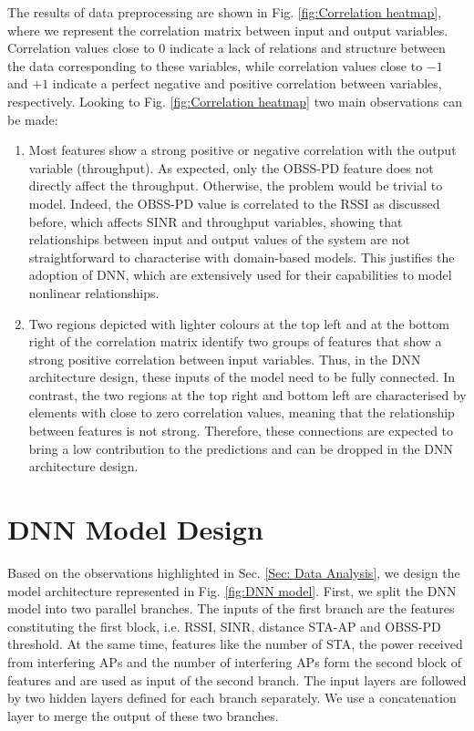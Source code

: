 \documentclass[10pt,conference ]{IEEEtran}
\begin{document}
The results of data preprocessing are shown in Fig. \ref{fig:Correlation heatmap}, where we represent the correlation matrix between input and output variables. 
Correlation values close to $0$ indicate a lack of relations and structure between the data corresponding to these variables, while correlation values close to $-1$ and $+1$ indicate a perfect negative and positive correlation between variables, respectively. 
Looking to Fig. \ref{fig:Correlation heatmap} two main observations can be made: 
\begin{enumerate}
\item Most features show a strong positive or negative correlation with the output variable (throughput). 
As expected, only the \ac{OBSS}-\ac{PD} feature does not directly affect the throughput. 
Otherwise, the problem would be trivial to model. 
Indeed, the \ac{OBSS}-\ac{PD} value is correlated to the \ac{RSSI} as discussed before, which affects \ac{SINR} and throughput variables, showing that relationships between input and output values of the system are not straightforward to characterise with domain-based models. 
This justifies the adoption of \ac{DNN}, which are extensively used for their capabilities to model nonlinear relationships. 
\item Two regions depicted with lighter colours  at the top left and at the bottom right of the correlation matrix identify two groups of features that show a strong positive correlation between input variables. 
Thus, in the \ac{DNN} architecture design, these inputs of the model need to be fully connected. 
In contrast, the two regions at the top right and bottom left are characterised by elements with close to zero correlation values, meaning that the relationship between features is not strong. 
Therefore, these connections are expected to bring a low contribution to the predictions and can be dropped in the \ac{DNN} architecture design. 
\end{enumerate}

\section{DNN Model Design}\label{Sec:Centralised Solution}
Based on the observations highlighted in Sec. \ref{Sec: Data Analysis}, we design the model architecture represented in Fig. \ref{fig:DNN model}.  
First, we split the \ac{DNN} model into two parallel branches. 
The inputs of the first branch are the features constituting the first block, i.e. \ac{RSSI}, \ac{SINR}, distance \ac{STA}-\ac{AP} and \ac{OBSS}-\ac{PD} threshold.
At the same time, features like the number of \ac{STA}, the power received from interfering \acp{AP} and the number of interfering \acp{AP} form the second block of features and are used as input of the second branch. 
The input layers are followed by two hidden layers defined for each branch separately. 
We use a concatenation layer to merge the output of these two branches. 
\end{document}
